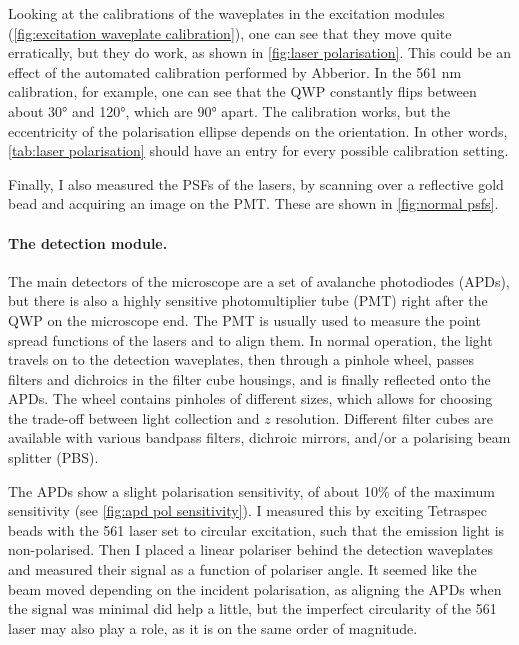 Looking at the calibrations of the waveplates in the excitation modules (\autoref{fig:excitation waveplate calibration}), one can see that they move quite erratically, but they do work, as shown in \autoref{fig:laser polarisation}. This could be an effect of the automated calibration performed by Abberior. In the 561 nm calibration, for example, one can see that the QWP constantly flips between about \ang{30} and \ang{120}, which are \ang{90} apart. The calibration works, but the eccentricity of the polarisation ellipse depends on the orientation. In other words, \autoref{tab:laser polarisation} should have an entry for every possible calibration setting.

Finally, I also measured the PSFs of the lasers, by scanning over a reflective gold bead and acquiring an image on the PMT. These are shown in \autoref{fig:normal psfs}.

\paragraph{The detection module.} The main detectors of the microscope are a set of avalanche photodiodes (APDs), but there is also a highly sensitive photomultiplier tube (PMT) right after the QWP on the microscope end. The PMT is usually used to measure the point spread functions of the lasers and to align them. In normal operation, the light travels on to the detection waveplates, then through a pinhole wheel, passes filters and dichroics in the filter cube housings, and is finally reflected onto the APDs. The wheel contains pinholes of different sizes, which allows for choosing the trade-off between light collection and $ z $ resolution. Different filter cubes are available with various bandpass filters, dichroic mirrors, and/or a polarising beam splitter (PBS).

The APDs show a slight polarisation sensitivity, of about 10\% of the maximum sensitivity (see \autoref{fig:apd pol sensitivity}). I measured this by exciting Tetraspec beads with the 561 laser set to circular excitation, such that the emission light is non-polarised. Then I placed a linear polariser behind the detection waveplates and measured their signal as a function of polariser angle. It seemed like the beam moved depending on the incident polarisation, as aligning the APDs when the signal was minimal did help a little, but the imperfect circularity of the 561 laser may also play a role, as it is on the same order of magnitude. 


